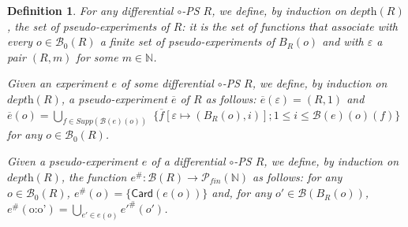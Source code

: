 \documentclass{article}
\theoremstyle{plain}
\newtheorem{definition}{Definition}
\newcommand{\Nat}{\ensuremath{\mathbb{N}}}
\newcommand{\emptysequence}{\varepsilon}
\newcommand{\Card}[1]{\textsf{Card}\left( #1 \right)}
\newcommand{\boxes}[1]{\mathcal{B}(#1)}
\newcommand{\boxesatzero}[1]{\mathcal{B}_{0}(#1)}
\begin{document}
\begin{definition}\label{defin: experiment induces pseudo-experiment}
For any differential $\circ$-PS $R$, we define, by induction on $\textit{depth}(R)$, the set of \emph{pseudo-experiments of $R$}: it is the set of functions that associate with every $o \in \boxesatzero{R}$ a finite set of pseudo-experiments of $B_R(o)$ and with $\emptysequence$ a pair $(R, m)$ for some $m \in \Nat$.

Given an experiment $e$ of some differential $\circ$-PS $R$, we define, by induction on $\textit{depth}(R)$, a pseudo-experiment $\overline{e}$ of $R$ as follows: $\overline{e}(\emptysequence) = (R, 1)$ and $\overline{e}(o) = \bigcup_{f \in \textit{Supp}(\boxes{e}(o))}$ $\{ \overline{f}[\emptysequence \mapsto (B_R(o), i)] ; 1 \leq i \leq \boxes{e}(o)(f) \}$ for any $o \in \boxesatzero{R}$.

Given a pseudo-experiment $e$ of a differential $\circ$-PS $R$, we define, by induction on $\textit{depth}(R)$, the function $e^\#: \boxes{R} \rightarrow \mathcal{P}_\textit{fin}(\Nat)$ as follows: for any $o \in \boxesatzero{R}$, $e^\#(o) = \{ \Card{e(o)} \}$ and, for any $o' \in \boxes{B_R(o)}$, $e^\#(\mbox{o:o'}) = \bigcup_{e' \in e(o)} {e'}^\#(o')$.
\end{definition}
\end{document}
